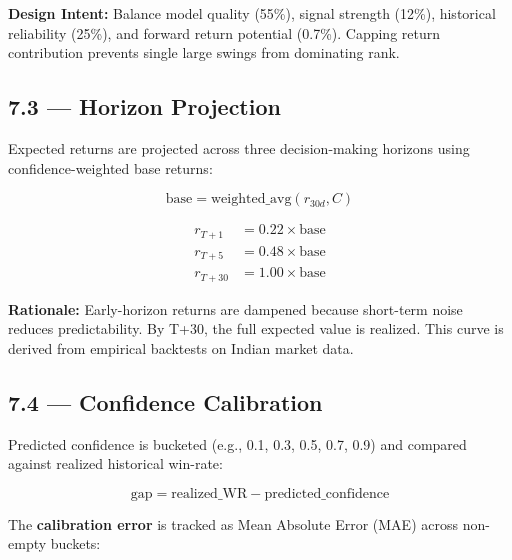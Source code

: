 \documentclass[11pt,a4paper]{article}
\begin{document}
\vspace{0.5cm}

\textbf{Design Intent:} Balance model quality (55\%), signal strength (12\%), historical reliability (25\%), and forward return potential (0.7\%). Capping return contribution prevents single large swings from dominating rank.

\subsection{7.3 — Horizon Projection}

Expected returns are projected across three decision-making horizons using confidence-weighted base returns:

\begin{equation}
\text{base} = \text{weighted\_avg}(r_{30d}, C)
\end{equation}

\begin{equation}
\begin{aligned}
r_{T+1} &= 0.22 \times \text{base} \\
r_{T+5} &= 0.48 \times \text{base} \\
r_{T+30} &= 1.00 \times \text{base}
\end{aligned}
\end{equation}

\vspace{0.3cm}

\textbf{Rationale:} Early-horizon returns are dampened because short-term noise reduces predictability. By T+30, the full expected value is realized. This curve is derived from empirical backtests on Indian market data.

\subsection{7.4 — Confidence Calibration}

Predicted confidence is bucketed (e.g., 0.1, 0.3, 0.5, 0.7, 0.9) and compared against realized historical win-rate:

\begin{equation}
\text{gap} = \text{realized\_WR} - \text{predicted\_confidence}
\end{equation}

\vspace{0.3cm}

The \textbf{calibration error} is tracked as Mean Absolute Error (MAE) across non-empty buckets:
\end{document}
